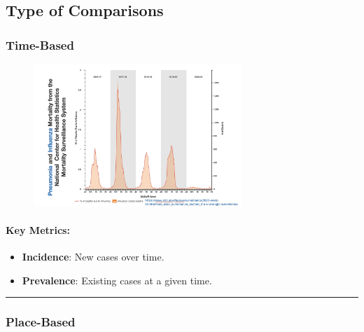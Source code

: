 \documentclass[
  letterpaper,
  DIV=11,
  numbers=noendperiod]{scrartcl}
\let\oldparagraph\paragraph
\renewcommand{\paragraph}[1]{\oldparagraph{#1}\mbox{}}
\providecommand{\tightlist}{%
  \setlength{\itemsep}{0pt}\setlength{\parskip}{0pt}}\usepackage{longtable,booktabs,array}
\begin{document}
\hypertarget{type-of-comparisons}{%
\subsection{\texorpdfstring{{\textbf{Type of
Comparisons}}}{Type of Comparisons}}\label{type-of-comparisons}}

\hypertarget{time-based}{%
\subsubsection{\texorpdfstring{{\textbf{Time-Based}}}{Time-Based}}\label{time-based}}

\begin{figure}

{\centering \includegraphics[width=0.7\textwidth,height=\textheight]{week2_files/imgs/timeBased.jpg}

}

\end{figure}

\hypertarget{key-metrics}{%
\paragraph{Key Metrics:}\label{key-metrics}}

\begin{itemize}
\tightlist
\item
  \textbf{Incidence}: New cases over time.
\item
  \textbf{Prevalence}: Existing cases at a given time.
\end{itemize}

\begin{center}\rule{0.5\linewidth}{0.5pt}\end{center}

\hypertarget{place-based}{%
\subsubsection{\texorpdfstring{{\textbf{Place-Based}}}{Place-Based}}\label{place-based}}
\end{document}
